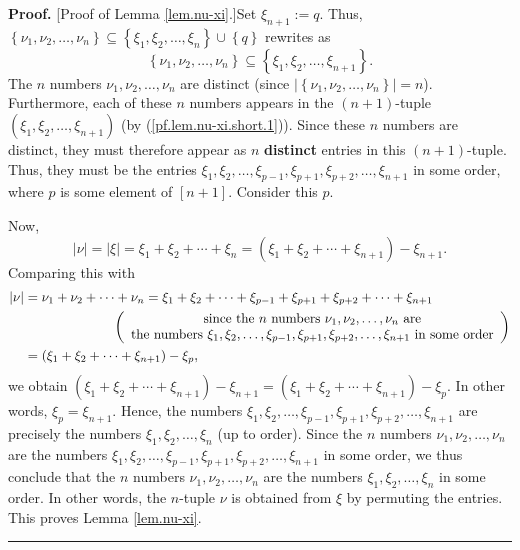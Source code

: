 \documentclass
[numbers=enddot,12pt,final,onecolumn,notitlepage,english]{scrartcl}%
\theoremstyle{definition}
\newenvironment{proof}[1][Proof]{\noindent\textbf{#1.} }{\ \rule{0.5em}{0.5em}}
\newenvironment{vershort}{}{}
\begin{document}
\begin{vershort}
\begin{proof}
[Proof of Lemma \ref{lem.nu-xi}.]Set $\xi_{n+1}:=q$. Thus, $\left\{  \nu
_{1},\nu_{2},\ldots,\nu_{n}\right\}  \subseteq\left\{  \xi_{1},\xi_{2}%
,\ldots,\xi_{n}\right\}  \cup\left\{  q\right\}  $ rewrites as
\begin{equation}
\left\{  \nu_{1},\nu_{2},\ldots,\nu_{n}\right\}  \subseteq\left\{  \xi_{1}%
,\xi_{2},\ldots,\xi_{n+1}\right\}  . \label{pf.lem.nu-xi.short.1}%
\end{equation}
The $n$ numbers $\nu_{1},\nu_{2},\ldots,\nu_{n}$ are distinct (since
$\left\vert \left\{  \nu_{1},\nu_{2},\ldots,\nu_{n}\right\}  \right\vert =n$).
Furthermore, each of these $n$ numbers appears in the $\left(  n+1\right)
$-tuple $\left(  \xi_{1},\xi_{2},\ldots,\xi_{n+1}\right)  $ (by
(\ref{pf.lem.nu-xi.short.1})). Since these $n$ numbers are distinct, they must
therefore appear as $n$ \textbf{distinct} entries in this $\left(  n+1\right)
$-tuple. Thus, they must be the entries $\xi_{1},\xi_{2},\ldots,\xi_{p-1}%
,\xi_{p+1},\xi_{p+2},\ldots,\xi_{n+1}$ in some order, where $p$ is some
element of $\left[  n+1\right]  $. Consider this $p$.

Now,%
\[
\left\vert \nu\right\vert =\left\vert \xi\right\vert =\xi_{1}+\xi_{2}%
+\cdots+\xi_{n}=\left(  \xi_{1}+\xi_{2}+\cdots+\xi_{n+1}\right)  -\xi_{n+1}.
\]
Comparing this with%
\begin{align*}
\left\vert \nu\right\vert  &  =\nu_{1}+\nu_{2}+\cdots+\nu_{n}=\xi_{1}+\xi
_{2}+\cdots+\xi_{p-1}+\xi_{p+1}+\xi_{p+2}+\cdots+\xi_{n+1}\\
&  \ \ \ \ \ \ \ \ \ \ \ \ \ \ \ \ \ \ \ \ \left(
\begin{array}
[c]{c}%
\text{since the }n\text{ numbers }\nu_{1},\nu_{2},\ldots,\nu_{n}\text{ are}\\
\text{the numbers }\xi_{1},\xi_{2},\ldots,\xi_{p-1},\xi_{p+1},\xi_{p+2}%
,\ldots,\xi_{n+1}\text{ in some order}%
\end{array}
\right) \\
&  =\left(  \xi_{1}+\xi_{2}+\cdots+\xi_{n+1}\right)  -\xi_{p},
\end{align*}
we obtain $\left(  \xi_{1}+\xi_{2}+\cdots+\xi_{n+1}\right)  -\xi_{n+1}=\left(
\xi_{1}+\xi_{2}+\cdots+\xi_{n+1}\right)  -\xi_{p}$. In other words, $\xi
_{p}=\xi_{n+1}$. Hence, the numbers $\xi_{1},\xi_{2},\ldots,\xi_{p-1}%
,\xi_{p+1},\xi_{p+2},\ldots,\xi_{n+1}$ are precisely the numbers $\xi_{1}%
,\xi_{2},\ldots,\xi_{n}$ (up to order). Since the $n$ numbers $\nu_{1},\nu
_{2},\ldots,\nu_{n}$ are the numbers $\xi_{1},\xi_{2},\ldots,\xi_{p-1}%
,\xi_{p+1},\xi_{p+2},\ldots,\xi_{n+1}$ in some order, we thus conclude that
the $n$ numbers $\nu_{1},\nu_{2},\ldots,\nu_{n}$ are the numbers $\xi_{1}%
,\xi_{2},\ldots,\xi_{n}$ in some order. In other words, the $n$-tuple $\nu$ is
obtained from $\xi$ by permuting the entries. This proves Lemma
\ref{lem.nu-xi}.
\end{proof}
\end{vershort}
\end{document}
